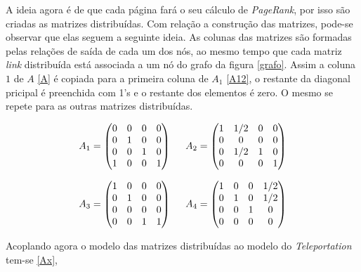 A ideia agora é de que cada página fará o seu cálculo de \textit{PageRank}, por isso são criadas as matrizes  distribuídas. Com relação a construção das matrizes, pode-se observar que elas seguem a seguinte ideia. As colunas das matrizes são formadas pelas relações de saída de cada um dos nós, ao mesmo tempo que cada matriz \textit{link} distribuída está associada a um nó do grafo da figura \ref{grafo}. Assim a coluna $1$ de $A$ \eqref{A} é copiada para a primeira coluna de $A_1$ \eqref{A12}, o restante da diagonal pricipal é preenchida com 1's e o restante dos elementos é zero. O mesmo se repete para as outras matrizes distribuídas.

\begin{equation}\label{A12}
A_1 = \begin{pmatrix}
 0 &  0  & 0 &  0 \\
 0 &  1  & 0 &  0 \\
 0 &  0  & 1 &  0  \\
 1 &  0  & 0 &  1
\end{pmatrix}
%
\hspace{0.5cm}
%
A_2 = \begin{pmatrix}
 1 & 1/2 & 0 &  0 \\
 0 &  0  & 0 &  0 \\
 0 & 1/2 & 1 &  0  \\
 0 &  0  & 0 &  1
\end{pmatrix}
\end{equation}

\vspace{0.1cm}

\begin{equation}\label{A34}
A_3 = \begin{pmatrix}
 1 &  0  & 0 &  0 \\
 0 &  1  & 0 &  0 \\
 0 &  0  & 0 &  0  \\
 0 &  0  & 1 &  1
\end{pmatrix}
%
\hspace{0.5cm}
%
A_4 = \begin{pmatrix}
 1 &  0  & 0 & 1/2 \\
 0 &  1  & 0 & 1/2 \\
 0 &  0  & 1 &  0  \\
 0 &  0  & 0 &  0
\end{pmatrix}
\end{equation}	

Acoplando agora o modelo das matrizes distribuídas ao modelo do \textit{Teleportation} tem-se \eqref{Ax},

